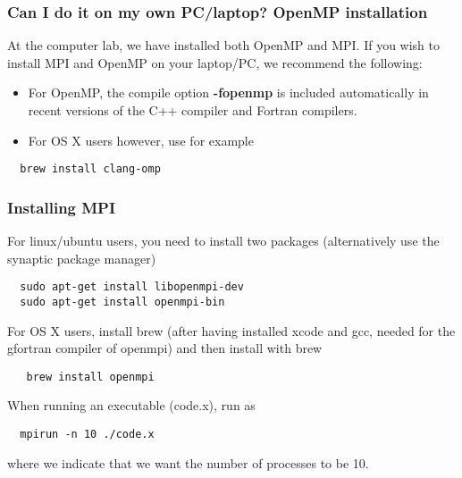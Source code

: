 \documentclass{beamer}
\begin{document}
\begin{frame}
\frametitle{Can I do it on my own PC/laptop? OpenMP installation}

\begin{block}{}
At the computer lab, we have installed both OpenMP and MPI. If you wish to install MPI and OpenMP 
on your laptop/PC, we recommend the following:
\begin{itemize}
\item For OpenMP, the compile option \textbf{-fopenmp} is included automatically in recent versions of the C++ compiler and Fortran compilers. 

\item For OS X users however, use for example 
\end{itemize}

\noindent
\begin{verbatim}
  brew install clang-omp
\end{verbatim}
\end{block}
\end{frame}

\begin{frame}
\frametitle{Installing MPI}

\begin{block}{}
For linux/ubuntu users, you need to install two packages (alternatively use the synaptic package manager)
\begin{verbatim}
  sudo apt-get install libopenmpi-dev
  sudo apt-get install openmpi-bin
\end{verbatim}
For OS X users, install brew (after having installed xcode and gcc, needed for the 
gfortran compiler of openmpi) and then install with brew
\begin{verbatim}
   brew install openmpi
\end{verbatim}
When running an executable (code.x), run as
\begin{verbatim}
  mpirun -n 10 ./code.x
\end{verbatim}
where we indicate that we want  the number of processes to be 10.


\end{block}
\end{frame}
\end{document}
